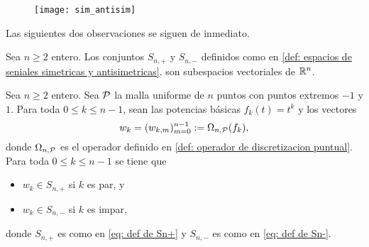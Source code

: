 \begin{figure}[H]
	\centering
	\texttt{[image: sim\_antisim]} 
\end{figure}	

\begin{comment}
{\Huge{$n$ par}}\\

{\Huge{$n$ impar}}\\

{\Huge{$x= (x_{0}, x_{1}, x_{2}, x_{3}, x_{4}, x_{5}) \in S_{6,+}$}}\\

{\Huge{$x= (x_{0}, x_{1}, x_{2}, x_{3}, x_{4}, x_{5}) \in S_{6,-}$}}\\

{\Huge{$x= (x_{0}, x_{1}, x_{2}, x_{3}, x_{4}) \in S_{5,+}$}}\\

{\Huge{$x= (x_{0}, x_{1}, x_{2}, x_{3}, x_{4}) \in S_{5,-}$}}\\
\end{comment}


Las siguientes dos observaciones se siguen de inmediato.
\begin{obs}
\label{obs: espacios de senales sim y antisim}
Sea $n \geq 2$ entero.  
Los conjuntos $S_{n,+}$ y $S_{n,-}$ definidos como en  
\ref{def: espacios de seniales simetricas y antisimetricas}. 
son subespacios vectoriales de $\mathbb{R}^{n}$.
\end{obs}

\begin{obs}
\label{obs: pertenencia}
Sea $n \geq 2$ entero.  
Sea $\mathcal{P}$ la malla
uniforme de $n$ puntos con puntos extremos $-1$ y $1$.
Para toda $0 \leq k \leq n-1$, sean
las potencias básicas $f_{k}(t)=t^{k}$ y los vectores
\begin{equation}
\label{eq4: 10Dic}
w_{k}=(w_{k,m})_{m=0}^{n-1} := \Omega_{n, \mathcal{P}}(f_{k}),
\end{equation}
donde $\Omega_{n, \mathcal{P}}$ es el operador definido en 
\ref{def: operador de discretizacion puntual}.
Para toda $0 \leq k \leq n-1$ se tiene que
\begin{itemize}
\item $w_{k} \in S_{n,+}$ si $k$ es par, y
\item $w_{k} \in S_{n,-}$ si $k$ es impar,
\end{itemize}
donde $S_{n,+}$ es como en
\eqref{eq: def de Sn+} y
$S_{n,-}$ es como en 
\eqref{eq: def de Sn-}.
\end{obs}

